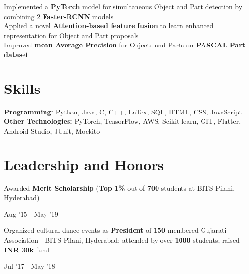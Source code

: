 \documentclass[]{Resume}
\begin{document}
\pt Implemented a \textbf{PyTorch} model for simultaneous Object and Part detection by combining 2 \textbf{Faster-RCNN} models \\
\pt Applied a novel \textbf{Attention-based feature fusion} to learn enhanced representation for Object and Part proposals \\
\pt Improved \textbf{mean Average Precision} for Objects and Parts on \textbf{PASCAL-Part dataset}
\sectionsep

\section{Skills} 
\hrulefill

\pt \textbf{Programming:} Python, Java, C, C++, LaTex, SQL, HTML, CSS, JavaScript \\
\pt \textbf{Other Technologies:} PyTorch, TensorFlow, AWS, Scikit-learn, GIT, Flutter, Android Studio, JUnit, Mockito

\sectionsep

\section{Leadership and Honors} 
\hrulefill 

\begin{minipage}[t]{.8\textwidth}
	\pt Awarded \textbf{Merit Scholarship} (\textbf{Top 1\%} out of \textbf{700} students at BITS Pilani, Hyderabad)
\end{minipage}%
\begin{minipage}[t]{.2\textwidth}
	\hfill Aug '15 - May '19
\end{minipage}

\begin{minipage}[t]{.8\textwidth}
	\pt Organized cultural dance events as \textbf{President} of \textbf{150}-membered Gujarati Association - BITS Pilani, Hyderabad; attended by over \textbf{1000} students; raised \textbf{INR 30k} fund
\end{minipage}%
\begin{minipage}[t]{.2\textwidth}
	\hfill Jul '17 - May '18
\end{minipage}


\end{document}
